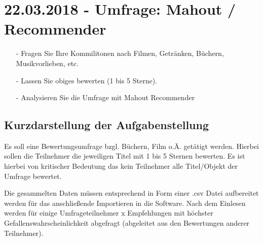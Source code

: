 \section{22.03.2018 - Umfrage: Mahout / Recommender}
\begin{itemize}
\item[-] Fragen Sie Ihre Kommilitonen nach Filmen, Getränken, Büchern, Musikvorlieben, etc.
\item[-] Lassen Sie obiges bewerten (1 bis 5 Sterne).
\item[-] Analysieren Sie die Umfrage mit Mahout Recommender
\end{itemize}

\subsection{Kurzdarstellung der Aufgabenstellung}
Es soll eine Bewertungsumfrage bzgl. Büchern, Film o.Ä. getätigt werden. Hierbei sollen die Teilnehmer die jeweiligen Titel mit 1 bis 5 Sternen bewerten. Es ist hierbei von kritischer Bedeutung das kein Teilnehmer alle Titel/Objekt der Umfrage bewertet.

Die gesammelten Daten müssen entsprechend in Form einer .csv Datei aufbereitet werden für das anschließende Importieren in die Software. Nach dem Einlesen werden für einige Umfrageteilnehmer x Empfehlungen mit höchster Gefallenswahrscheinlichkeit abgefragt (abgeleitet aus den Bewertungen anderer Teilnehmer).

